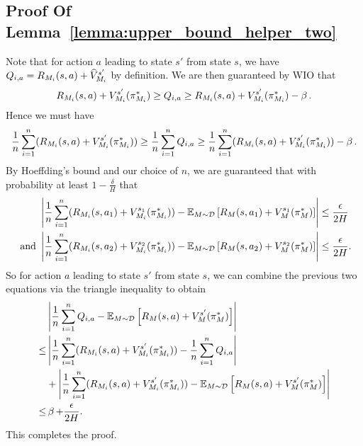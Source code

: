\documentclass[11pt,twoside]{article}
\begin{document}
\subsection{Proof Of Lemma~\ref{lemma:upper_bound_helper_two}}
\label{app:upper_lem2}
Note that for action $a$ leading to state $s'$ from state $s$, we have $Q_{i, a} = R_{M_i}(s, a) + \widehat{V}^{{s' }}_{{M_i }}$ by definition. We are then guaranteed by WIO that
$$
R_{M_i}(s, a) + V^{{s' }}_{{M_i }}({\pi^*_{M_i}}) \geq Q_{i, a} \geq R_{M_i}(s, a) + V^{{s' }}_{{M_i }}({\pi^*_{M_i}}) - \operatorname{\beta}.
$$
Hence we must have
$$
\frac{1}{n} \sum_{i=1}^n ( R_{M_i}(s, a) + V^{{s' }}_{{M_i }}({\pi^*_{M_i}}) ) \geq \frac{1}{n} \sum_{i=1}^n Q_{i, a} \geq \frac{1}{n} \sum_{i=1}^n (R_{M_i}(s, a) + V^{{s' }}_{{M_i }}({\pi^*_{M_i}})) - \operatorname{\beta}.
$$
By Hoeffding's bound and our choice of $n$, we are guaranteed that with probability at least $1 - \frac{\delta}{H}$ that
\begin{equation*}
\begin{split}
&\left \vert \frac{1}{n} \sum_{i=1}^n (R_{M_i}(s, a_1) + V^{{s_1 }}_{{M_i }}({\pi^*_{M_i}})) - \operatorname{\mathbb{E}}_{M \sim \mathcal{D}} \left[ R_M(s, a_1) + V^{{s_1 }}_{{M }}({\pi^*_M}) \right] \right \vert \leq \frac{\epsilon}{2H} \\
\text{ and } &\left \vert \frac{1}{n} \sum_{i=1}^n (R_{M_i}(s, a_2) + V^{{s_2 }}_{{M_i }}({\pi^*_{M_i}}) ) - \operatorname{\mathbb{E}}_{M \sim \mathcal{D}} \left[ R_M(s, a_2) + V^{{s_2 }}_{{M }}({\pi^*_M}) \right] \right \vert \leq \frac{\epsilon}{2H}.
\end{split}
\end{equation*}
So for action $a$ leading to state $s'$ from state $s$, we can combine the previous two equations via the triangle inequality to obtain
\begin{align*}
&\left \vert \frac{1}{n} \sum_{i=1}^n Q_{i, a} - \operatorname{\mathbb{E}}_{M \sim \mathcal{D}} \left[ R_M(s, a) + V^{{s' }}_{{M }}({\pi^*_M}) \right] \right \vert \\
\leq &\left \vert \frac{1}{n} \sum_{i=1}^n (R_{M_i}(s, a) + V^{{s' }}_{{M_i }}({\pi^*_{M_i}})) - \frac{1}{n} \sum_{i=1}^n Q_{i, a} \right \vert \\
&+ \left \vert \frac{1}{n} \sum_{i=1}^n (R_{M_i}(s, a) + V^{{s' }}_{{M_i }}({\pi^*_{M_i}}) ) - \operatorname{\mathbb{E}}_{M \sim \mathcal{D}} \left[ R_M(s, a) + V^{{s' }}_{{M }}({\pi^*_M}) \right] \right \vert \\
\leq &\operatorname{\beta} + \frac{\epsilon}{2H}.
\end{align*}
This completes the proof.
\end{document}
